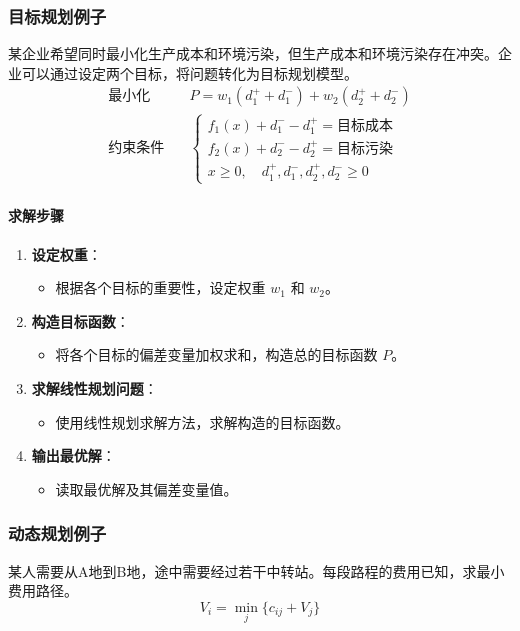 \documentclass[UTF8]{ctexart}
\begin{document}
\subsubsection {目标规划例子}
某企业希望同时最小化生产成本和环境污染，但生产成本和环境污染存在冲突。企业可以通过设定两个目标，将问题转化为目标规划模型。
\[
\begin{aligned}
\text{最小化} & \quad P = w_1 (d_1^+ + d_1^-) + w_2 (d_2^+ + d_2^-) \\
\text{约束条件} & \quad 
\begin{cases}
f_1(x) + d_1^- - d_1^+ = \text{目标成本} \\
f_2(x) + d_2^- - d_2^+ = \text{目标污染} \\
x \geq 0, \quad d_1^+, d_1^-, d_2^+, d_2^- \geq 0
\end{cases}
\end{aligned}
\]

\paragraph{求解步骤}
\begin{enumerate}
    \item \textbf{设定权重}：
        \begin{itemize}
            \item 根据各个目标的重要性，设定权重 \( w_1 \) 和 \( w_2 \)。
        \end{itemize}
    \item \textbf{构造目标函数}：
        \begin{itemize}
            \item 将各个目标的偏差变量加权求和，构造总的目标函数 \( P \)。
        \end{itemize}
    \item \textbf{求解线性规划问题}：
        \begin{itemize}
            \item 使用线性规划求解方法，求解构造的目标函数。
        \end{itemize}
    \item \textbf{输出最优解}：
        \begin{itemize}
            \item 读取最优解及其偏差变量值。
        \end{itemize}
\end{enumerate}

\subsubsection {动态规划例子}
某人需要从A地到B地，途中需要经过若干中转站。每段路程的费用已知，求最小费用路径。
\[
V_i = \min_{j} \{ c_{ij} + V_j \}
\]
\end{document}
